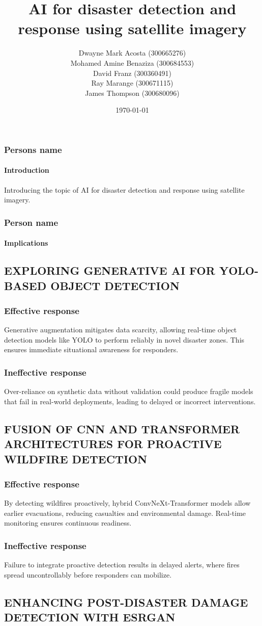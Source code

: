 \documentclass{beamer}
\title{AI for disaster detection and response using satellite imagery}
\author{Dwayne Mark Acosta (300665276) \\ Mohamed Amine Benaziza (300684553) \\ David Franz (300360491) \\ Ray Marange (300671115) \\ James Thompson (300680096)}
\date{\today}
\newcommand{\namedframe}[3]{
  \begin{frame}
    \frametitle{#1}
    \framesubtitle{#2}
    #3
  \end{frame}
}
\begin{document}
\frame{\titlepage}

\namedframe{Persons name}{Introduction}{
  Introducing the topic of AI for disaster detection and response using satellite imagery.
}

\namedframe{Person name}{Implications}{
\subsection{EXPLORING GENERATIVE AI FOR YOLO-BASED OBJECT DETECTION}
\subsubsection{Effective response}
Generative augmentation mitigates data scarcity, allowing real-time object detection models like YOLO to perform reliably in novel disaster zones. This ensures immediate situational awareness for responders.

\subsubsection{Ineffective response}
Over-reliance on synthetic data without validation could produce fragile models that fail in real-world deployments, leading to delayed or incorrect interventions.

\subsection{FUSION OF CNN AND TRANSFORMER ARCHITECTURES FOR PROACTIVE WILDFIRE DETECTION}
\subsubsection{Effective response}
By detecting wildfires proactively, hybrid ConvNeXt-Transformer models allow earlier evacuations, reducing casualties and environmental damage. Real-time monitoring ensures continuous readiness.

\subsubsection{Ineffective response}
Failure to integrate proactive detection results in delayed alerts, where fires spread uncontrollably before responders can mobilize.

\subsection{ENHANCING POST-DISASTER DAMAGE DETECTION WITH ESRGAN}
}
\end{document}
